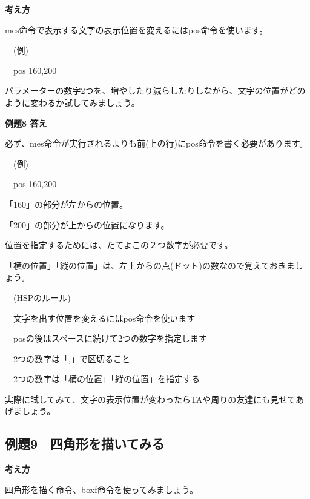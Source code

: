 \documentclass[a4paper,12pt]{jarticle}
\begin{document}
{\bfseries
考え方}

\bigskip

mes命令で表示する文字の表示位置を変えるにはpos命令を使います。


\bigskip

\ \ (例)

\ \ pos 160,200


\bigskip

パラメーターの数字2つを、増やしたり減らしたりしながら、文字の位置がどのように変わるか試してみましょう。

\bigskip

\bigskip

{\bfseries
例題8 答え}

\bigskip

必ず、mes命令が実行されるよりも前(上の行)にpos命令を書く必要があります。


\bigskip

\ \ (例)

\ \ pos 160,200


\bigskip

「160」の部分が左からの位置。

「200」の部分が上からの位置になります。

位置を指定するためには、たてよこの２つ数字が必要です。

「横の位置」「縦の位置」は、左上からの点(ドット)の数なので覚えておきましょう。


\bigskip

\ \ (HSPのルール)


\bigskip

\ \ 文字を出す位置を変えるにはpos命令を使います

\ \ posの後はスペースに続けて2つの数字を指定します

\ \ 2つの数字は「,」で区切ること

\ \ 2つの数字は「横の位置」「縦の位置」を指定する


\bigskip

実際に試してみて、文字の表示位置が変わったらTAや周りの友達にも見せてあげましょう。



\clearpage
\subsection{例題9　四角形を描いてみる}
\bigskip
\bigskip

{\bfseries
考え方}

\bigskip

四角形を描く命令、boxf命令を使ってみましょう。
\end{document}
